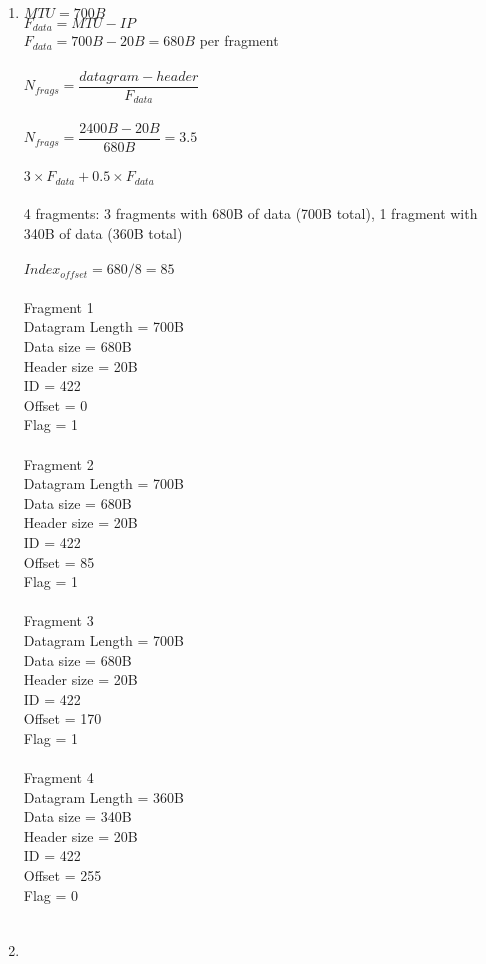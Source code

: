 \documentclass[12pt]{article}
\begin{document}
\begin{enumerate}
	\item $MTU = 700B$\\
		$F_{data} = MTU - IP$\\
		$F_{data} = 700B - 20B = 680B$ per fragment\\
		\\
		$N_{frags} = \dfrac{datagram - header}{F_{data}}$\\
		\\
		$N_{frags} = \dfrac{2400B - 20B}{680B} = 3.5$\\
		\\
		$3\times F_{data} + 0.5 \times F_{data}$\\
		\\
		4 fragments: 3 fragments with 680B of data (700B total), 1 fragment with 340B of data (360B total)\\
		\\
		$Index_{offset} = 680 / 8 = 85$\\
		\\
		Fragment 1\\
		Datagram Length = 700B\\
		Data size = 680B\\
		Header size = 20B\\
		ID = 422\\
		Offset = 0\\
		Flag = 1\\
		\\
		Fragment 2\\
		Datagram Length = 700B\\
		Data size = 680B\\
		Header size = 20B\\
		ID = 422\\
		Offset = 85\\
		Flag = 1\\
		\\
		Fragment 3\\
		Datagram Length = 700B\\
		Data size = 680B\\
		Header size = 20B\\
		ID = 422\\
		Offset = 170\\
		Flag = 1\\
		\\
		Fragment 4\\
		Datagram Length = 360B\\
		Data size = 340B\\
		Header size = 20B\\
		ID = 422\\
		Offset = 255\\
		Flag = 0\\
		\\
	\item \footnotesize
		\begin{tabular}{c|c|c|c|c|c|c|c}


\end{tabular}
\end{enumerate}
\end{document}
